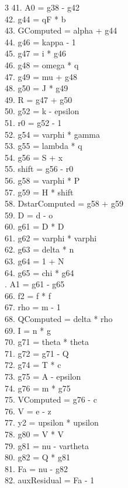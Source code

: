 \documentclass[10pt]{article}
\begin{document}
\begin{multicols}{3}
41. A0 = g38 - g42\\
42. g44 = qF * b\\
43. GComputed = alpha + g44\\
44. g46 = kappa - 1\\
45. g47 = i * g46\\
46. g48 = omega * q\\
47. g49 = mu + g48\\
48. g50 = J * g49\\
49. R = g47 + g50\\
50. g52 = k - epsilon\\
51. r0 = g52 - 1\\
52. g54 = varphi * gamma\\
53. g55 = lambda * q\\
54. g56 = S + x\\
55. shift = g56 - r0\\
56. g58 = varphi * P\\
57. g59 = H * shift\\
58. DstarComputed = g58 + g59\\
59. D = d - o\\
60. g61 = D * D\\
61. g62 = varphi * varphi\\
62. g63 = delta * n\\
63. g64 = 1 + N\\
64. g65 = chi * g64\\
. A1 = g61 - g65\\
66. f2 = f * f\\
67. rho = m - 1\\
68. QComputed = delta * rho\\
69. I = n * g\\
70. g71 = theta * theta\\
71. g72 = g71 - Q\\
72. g74 = T * c\\
73. g75 = A - epsilon\\
74. g76 = m * g75\\
75. VComputed = g76 - c\\
76. V = e - z\\
77. y2 = upsilon * upsilon\\
78. g80 = V * V\\
79. g81 = nu - vartheta\\
80. g82 = Q * g81\\
81. Fa = nu - g82\\
82. auxResidual = Fa - 1\\

\end{multicols}
\end{document}
